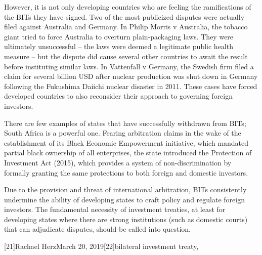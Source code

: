    However, it is not only developing countries who are feeling the
   ramifications of the BITs they have signed. Two of the most publicized
   disputes were actually filed against Australia and Germany. In Philip
   Morris v Australia, the tobacco giant tried to force Australia to
   overturn plain-packaging laws. They were ultimately unsuccessful -- the
   laws were deemed a legitimate public health measure -- but the dispute
   did cause several other countries to await the result before
   instituting similar laws. In Vattenfall v Germany, the Swedish firm
   filed a claim for several billion USD after nuclear production was shut
   down in Germany following the Fukushima Daiichi nuclear disaster in
   2011. These cases have forced developed countries to also reconsider
   their approach to governing foreign investors.

   There are few examples of states that have successfully withdrawn from
   BITs; South Africa is a powerful one. Fearing arbitration claims in the
   wake of the establishment of its Black Economic Empowerment initiative,
   which mandated partial black ownership of all enterprises, the state
   introduced the Protection of Investment Act (2015), which provides a
   system of non-discrimination by formally granting the same protections
   to both foreign and domestic investors.

   Due to the provision and threat of international arbitration, BITs
   consistently undermine the ability of developing states to craft policy
   and regulate foreign investors. The fundamental necessity of investment
   treaties, at least for developing states where there are strong
   institutions (such as domestic courts) that can adjudicate disputes,
   should be called into question.

   [21]Rachael HerzMarch 20, 2019[22]bilateral investment treaty,
